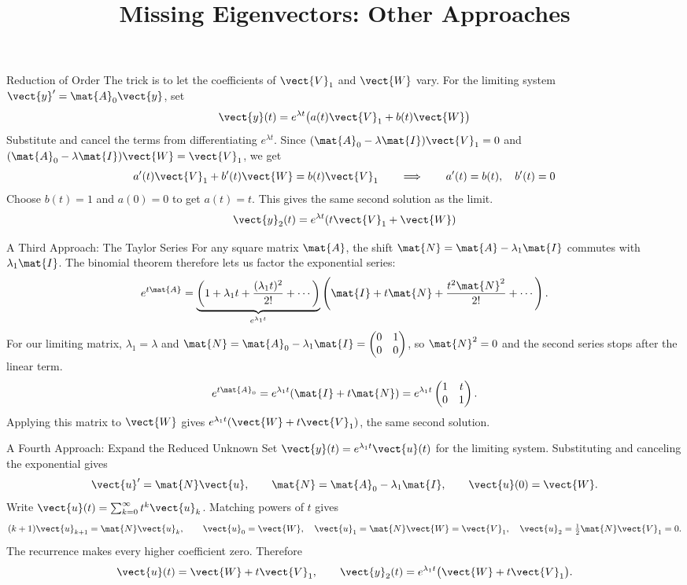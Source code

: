 \documentclass[11pt,aspectratio=169]{beamer}
\title{Missing Eigenvectors: Other Approaches}
\date{}
\begin{document}
\begin{frame}{Reduction of Order}
The trick is to let the coefficients of $\vect{V}_1$ and $\vect{W}$ vary.
For the limiting system $\vect{y}'=\mat{A}_0\vect{y}$, set
\[
  \vect{y}(t)=e^{\lambda t}\bigl(a(t)\vect{V}_1+b(t)\vect{W}\bigr)
\]
Substitute and cancel the terms from differentiating $e^{\lambda t}$.
Since $(\mat{A}_0-\lambda\mat{I})\vect{V}_1=0$ and
$(\mat{A}_0-\lambda\mat{I})\vect{W}=\vect{V}_1$, we get
\[
  a'(t)\vect{V}_1+b'(t)\vect{W}=b(t)\vect{V}_1
  \qquad\Longrightarrow\qquad
  a'(t)=b(t),\quad b'(t)=0
\]
Choose $b(t)=1$ and $a(0)=0$ to get $a(t)=t$. This gives the same
second solution as the limit.
\[
  \vect{y}_2(t)=e^{\lambda t}(t\vect{V}_1+\vect{W})
\]
\end{frame}

\begin{frame}{A Third Approach: The Taylor Series}
For any square matrix \(\mat{A}\), the shift \(\mat{N}=\mat{A}-\lambda_1\mat{I}\)
commutes with \(\lambda_1\mat{I}\). The binomial theorem therefore lets
us factor the exponential series:
\[
e^{t\mat{A}}
=
\underbrace{\left(1+\lambda_1 t+\frac{(\lambda_1 t)^2}{2!}+\cdots\right)}_{e^{\lambda_1 t}}
\left(\mat{I}+t\mat{N}+\frac{t^2\mat{N}^2}{2!}+\cdots\right).
\]
For our limiting matrix, \(\lambda_1=\lambda\) and
\(\mat{N}=\mat{A}_0-\lambda_1\mat{I}=\begin{pmatrix}0&1\\0&0\end{pmatrix}\),
so \(\mat{N}^2=0\) and the second series stops after the linear term.
\[
e^{t\mat{A}_0}
=e^{\lambda_1 t}(\mat{I}+t\mat{N})
=e^{\lambda_1 t}\begin{pmatrix}1&t\\0&1\end{pmatrix}.
\]
Applying this matrix to \(\vect{W}\) gives
\(e^{\lambda_1 t}(\vect{W}+t\vect{V}_1)\), the same second solution.
\end{frame}

\begin{frame}{A Fourth Approach: Expand the Reduced Unknown}
Set \(\vect{y}(t)=e^{\lambda_1 t}\vect{u}(t)\) for the limiting system.
Substituting and canceling the exponential gives
\[
\vect{u}'=\mat{N}\vect{u},\qquad
\mat{N}=\mat{A}_0-\lambda_1\mat{I},\qquad \vect{u}(0)=\vect{W}.
\]
Write \(\vect{u}(t)=\sum_{k=0}^{\infty}t^k\vect{u}_k\).
Matching powers of \(t\) gives
\[
(k+1)\vect{u}_{k+1}=\mat{N}\vect{u}_k,\qquad
\vect{u}_0=\vect{W},\quad
\vect{u}_1=\mat{N}\vect{W}=\vect{V}_1,\quad
\vect{u}_2=\tfrac12\mat{N}\vect{V}_1=0.
\]
The recurrence makes every higher coefficient zero. Therefore
\[
\vect{u}(t)=\vect{W}+t\vect{V}_1,\qquad
\vect{y}_2(t)=e^{\lambda_1 t}\bigl(\vect{W}+t\vect{V}_1\bigr).
\]
\end{frame}
\end{document}
